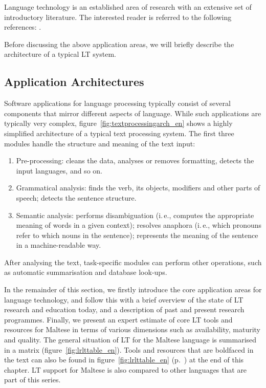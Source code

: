 \documentclass[]{../../metanetpaper}
\begin{document}
\begin{multicols}{2}
Language technology is an established area of research with an extensive set of introductory literature. The interested reader is referred to the following references:  \cite{carstensen-etal1, jurafsky-martin01, manning-schuetze1, lt-world1, lt-survey1}.

Before discussing the above application areas, we will briefly describe the architecture of a typical LT system.

\subsection{Application Architectures}

Software applications for language processing typically consist of several components that mirror different aspects of language. While such applications are typically very complex, figure~\ref{fig:textprocessingarch_en} shows a highly simplified architecture of a typical text processing system. The first three modules handle the structure and meaning of the text input:

\begin{enumerate}
\item Pre-processing: cleans the data, analyses or removes formatting, detects the input languages, and so on.
\item Grammatical analysis: finds the verb, its objects, modifiers and other parts of speech; detects the sentence structure.
\item Semantic analysis: performs disambiguation (i.\,e., computes the appropriate meaning of words in a given context); resolves anaphora (i.\,e., which pronouns refer to which nouns in the sentence); represents the meaning of the sentence in a machine-readable way.
\end{enumerate}

After analysing the text, task-specific modules can perform other operations, such as automatic summarisation and database look-ups.

In the remainder of this section, we firstly introduce the core application areas for language technology, and follow this with a brief overview of the state of LT research and education today, and a description of past and present research programmes. Finally, we present an expert estimate of core LT tools and resources for Maltese in terms of various dimensions such as availability, maturity and quality. The general situation of LT for the Maltese language is summarised in a matrix (figure~\ref{fig:lrlttable_en}). Tools and resources that are boldfaced in the text can also be found in figure~\ref{fig:lrlttable_en} (p.~\pageref{fig:lrlttable_en}) at the end of this chapter. LT support for Maltese is also compared to other languages that are part of this series.


\end{multicols}
\end{document}
